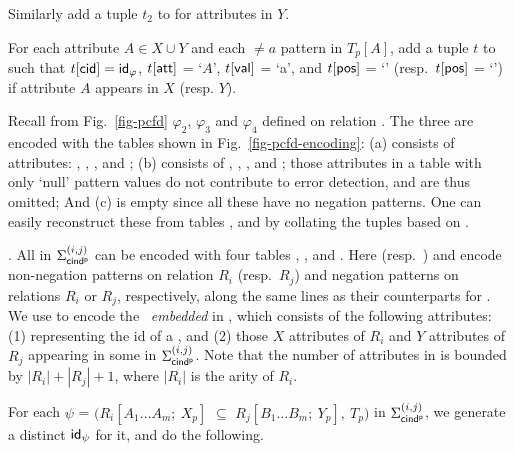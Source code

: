 \item[(2)] Similarly add a tuple $t_2$ to  for attributes in $Y$.


\item[(3)] For each attribute $A\in X\cup Y$ and each $\ne a$ pattern in
$T_p[A]$, add a tuple $t$ to \Enc{\ne} such that $t[\protect\mathsf{cid}] =
{\mathsf{id}}_\varphi$, $t[\protect\mathsf{att}]$ = `$A$', $t[\protect\mathsf{val}]$ = `a', and
$t[\protect\mathsf{pos}]$ = `\LHS' (resp.~$t[\protect\mathsf{pos}]$ = `\RHS') if attribute
$A$ appears in $X$ (resp. $Y$). \ei\vspace{-1ex}





\begin{example}
Recall from Fig.~\ref{fig-pcfd} \pCFDs $\varphi_2$, $\varphi_3$ and
$\varphi_4$ defined on relation . The three \pCFDs are
encoded with the tables shown in Fig.~\ref{fig-pcfd-encoding}: (a)
 consists of attributes: , , ,
 and ; (b)  consists of
, , ,  and
; those attributes in a table with only `null' pattern
values do not contribute to error detection, and are thus omitted;
And (c) \Enc{\ne} is empty since all these \pCFDs have no negation
patterns. One can easily reconstruct these \pCFDs from tables
,  and \Enc{\ne} by collating the tuples based on
.
\end{example}





. All \pCINDs in $\Sigma_{{\mathsf{cind^p}}}^{(i,j)}$
can be encoded with four tables
\Enc{}, ,  and \Enc{\ne}.
Here  (resp.~) and \Enc{\ne} encode non-negation
patterns on relation $R_i$ (resp.~$R_j$)
and negation patterns on relations $R_i$ or $R_j$,
respectively, along the same lines as their counterparts for
\pCFDs. We use
\Enc{} to encode the \INDs\ {\em embedded} in
\pCINDs, which consists of the following attributes: (1) 
representing the id of a \pCIND,  and (2) those $X$ attributes of $R_i$
and $Y$ attributes of $R_j$ appearing in some \pCINDs in $\Sigma_{{\mathsf{cind^p}}}^{(i,j)}$.
Note that the number of attributes in \Enc{} is bounded by $|R_i| + |R_j|
+ 1$, where $|R_i|$ is the arity of $R_i$.


For each \pCIND $\psi$ = $(R_i[A_1\ldots A_m;\ X_p]$ $\subseteq$
$R_j[B_1\ldots B_m;\ Y_p],\ T_p)$ in $\Sigma_{{\mathsf{cind^p}}}^{(i,j)}$, we generate a
distinct  ${\mathsf{id}}_\psi$ for it, and do the following.


